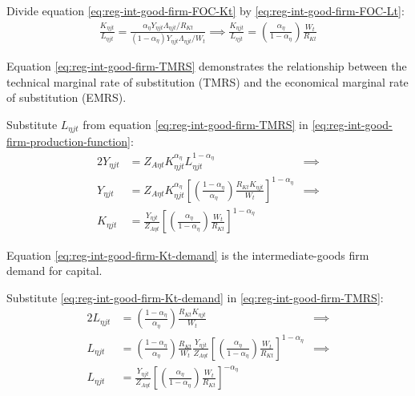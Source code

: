 \documentclass[
thesis.tex
]{subfiles}
\begin{document}
Divide equation \ref{eq:reg-int-good-firm-FOC-Kt} by \ref{eq:reg-int-good-firm-FOC-Lt}:
\begin{align}
	\frac{K_{\eta jt}}{L_{\eta jt}} = \frac{{\alpha_\eta} Y_{\eta jt} \Lambda_{\eta jt} /R_{Kt}}{(1-{\alpha_\eta}) Y_{\eta jt} \Lambda_{\eta jt} /W_t} \implies
	\frac{K_{\eta jt}}{L_{\eta jt}} = \left( \frac{{\alpha_\eta}}{1-{\alpha_\eta}} \right) \frac{W_t}{R_{Kt}} \label{eq:reg-int-good-firm-TMRS}
\end{align}

Equation \ref{eq:reg-int-good-firm-TMRS} demonstrates the relationship between the technical marginal rate of substitution (TMRS) and the economical marginal rate of substitution (EMRS). 

Substitute $L_{\eta jt}$ from equation \ref{eq:reg-int-good-firm-TMRS} in \ref{eq:reg-int-good-firm-production-function}:
\begin{alignat}{2}
	Y_{\eta jt} & = Z_{A\eta t} K_{\eta jt}^{\alpha_\eta} L_{\eta jt}^{1-{\alpha_\eta}} &\implies \nonumber \\
	Y_{\eta jt} & = Z_{A\eta t} K_{\eta jt}^{\alpha_\eta} \left[ \left( \frac{1-{\alpha_\eta}}{{\alpha_\eta}} \right) \frac{R_{Kt} K_{\eta jt}}{W_t} \right]^{1-{\alpha_\eta}} &\implies \nonumber \\
	K_{\eta jt} & = \frac{Y_{\eta jt}}{Z_{A\eta t}} \left[ \left( \frac{{\alpha_\eta}}{1-{\alpha_\eta}} \right) \frac{W_t}{R_{Kt}}\right]^{1-{\alpha_\eta}} \label{eq:reg-int-good-firm-Kt-demand}
\end{alignat}

Equation \ref{eq:reg-int-good-firm-Kt-demand} is the intermediate-goods firm demand for capital. 

Substitute \ref{eq:reg-int-good-firm-Kt-demand} in \ref{eq:reg-int-good-firm-TMRS}:
\begin{alignat}{2}
	L_{\eta jt} & = \left( \frac{1-{\alpha_\eta}}{{\alpha_\eta}} \right) \frac{R_{Kt} K_{\eta jt}}{W_t} &\implies \nonumber \\
	L_{\eta jt} & = \left( \frac{1-{\alpha_\eta}}{{\alpha_\eta}} \right) \frac{R_{Kt}}{W_t} \frac{Y_{\eta jt}}{Z_{A\eta t}} \left[ \left( \frac{{\alpha_\eta}}{1-{\alpha_\eta}} \right) \frac{W_t}{R_{Kt}}\right]^{1-{\alpha_\eta}} &\implies \nonumber \\
	L_{\eta jt} & = \frac{Y_{\eta jt}}{Z_{A\eta t}} \left[ \left( \frac{{\alpha_\eta}}{1-{\alpha_\eta}} \right) \frac{W_t}{R_{Kt}}\right]^{-{\alpha_\eta}} \label{eq:reg-int-good-firm-Lt-demand}
\end{alignat}
\end{document}
